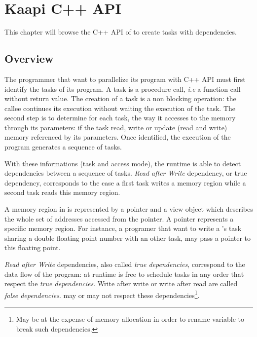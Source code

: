 \chapter{Kaapi C++ API}
\label{chap:api_cpp}

This chapter will browse the C++ API of \kaapi to create tasks with dependencies.

\section{Overview}
The programmer that want to parallelize its program with \kaapi C++ API must first identify the tasks of its program. A task is a procedure call, \textit{i.e} a function call without return value. The creation of a task is a non blocking operation: the callee continues its execution without waiting the execution of the task.
The second step is to determine for each task, the way it accesses to the memory through its parameters: if the task read, write or update (read and write) memory referenced by its parameters. Once identified, the execution of the program generates a sequence of tasks.

With these informations (task and access mode), the \kaapi runtime is able to detect dependencies between a sequence of tasks. \textit{Read after Write} dependency, or true dependency, corresponds to the case a first task writes a memory region while a second task reads this memory region. 

A memory region in \kaapi is represented by a pointer and a view object which describes the whole set of addresses accessed from the pointer. A pointer represents a specific memory region.  For instance, a programer that want to write a \kaapi's task sharing a double floating point number with an other task, may pass a pointer to this floating point.

\textit{Read after Write} dependencies, also called \textit{true dependencies}, correspond to the data flow of the program: at runtime \kaapi is free to schedule tasks in any order that respect the \textit{true dependencies}.
Write after write or write after read are called \textit{false dependencies}. \kaapi may or may not respect these dependencies\footnote{May be at the expense of memory allocation in order to rename variable to break such dependencies.}.
~\\

